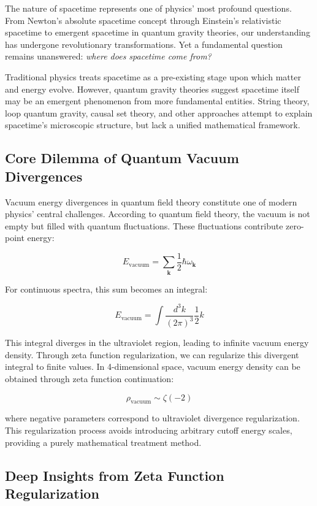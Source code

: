 \documentclass[12pt,a4paper]{article}
\begin{document}
The nature of spacetime represents one of physics' most profound questions. From Newton's absolute spacetime concept through Einstein's relativistic spacetime to emergent spacetime in quantum gravity theories, our understanding has undergone revolutionary transformations. Yet a fundamental question remains unanswered: \emph{where does spacetime come from?}

Traditional physics treats spacetime as a pre-existing stage upon which matter and energy evolve. However, quantum gravity theories suggest spacetime itself may be an emergent phenomenon from more fundamental entities. String theory, loop quantum gravity, causal set theory, and other approaches attempt to explain spacetime's microscopic structure, but lack a unified mathematical framework.

\subsection{Core Dilemma of Quantum Vacuum Divergences}

Vacuum energy divergences in quantum field theory constitute one of modern physics' central challenges. According to quantum field theory, the vacuum is not empty but filled with quantum fluctuations. These fluctuations contribute zero-point energy:

$$E_{\text{vacuum}} = \sum_{\mathbf{k}} \frac{1}{2} \hbar \omega_{\mathbf{k}}$$

For continuous spectra, this sum becomes an integral:

$$E_{\text{vacuum}} = \int \frac{d^3k}{(2\pi)^3} \frac{1}{2} k$$

This integral diverges in the ultraviolet region, leading to infinite vacuum energy density. Through zeta function regularization, we can regularize this divergent integral to finite values. In 4-dimensional space, vacuum energy density can be obtained through zeta function continuation:

$$\rho_{\text{vacuum}} \sim \zeta(-2)$$

where negative parameters correspond to ultraviolet divergence regularization. This regularization process avoids introducing arbitrary cutoff energy scales, providing a purely mathematical treatment method.

\subsection{Deep Insights from Zeta Function Regularization}
\end{document}
